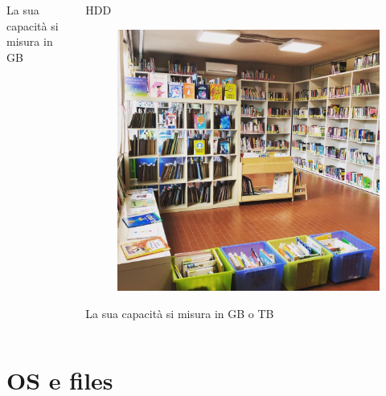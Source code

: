 \documentclass[handout]{beamer}
\begin{document}
\begin{frame}
\begin{columns}
\begin{column}{.3\textwidth}
\begin{center}
\begin{figure}
    \end{figure}
    La sua capacità si misura in GB
    \end{center}
\end{column}
\begin{column}{.3\textwidth}
  \begin{center}
    HDD 
    \begin{figure}
      \includegraphics[width=\columnwidth]{img/biblioteca.jpg}
    \end{figure}
    La sua capacità si misura in GB o TB
    \end{center}
\end{column}
\end{columns}
\end{frame}





\section{OS e files}
\end{document}
